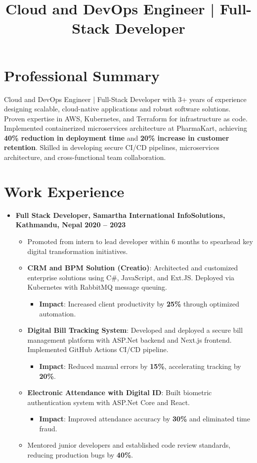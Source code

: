 \documentclass[11pt,a4paper,sans]{moderncv}
\title{Cloud and DevOps Engineer | Full-Stack Developer}
\newcommand{\sectionseparator}{\vspace{5pt}\par\noindent\makebox[\linewidth]{\rule{\textwidth}{0.4pt}}\vspace{0pt}}
\begin{document}
\makecvtitle

\section{Professional Summary}
Cloud and DevOps Engineer | Full-Stack Developer with 3+ years of experience designing scalable, cloud-native applications and robust software solutions. Proven expertise in AWS, Kubernetes, and Terraform for infrastructure as code. Implemented containerized microservices architecture at PharmaKart, achieving \textbf{40\% reduction in deployment time} and \textbf{20\% increase in customer retention}. Skilled in developing secure CI/CD pipelines, microservices architecture, and cross-functional team collaboration.

\sectionseparator

\section{Work Experience}
\begin{itemize}[leftmargin=*]
    \item \textbf{Full Stack Developer, Samartha International InfoSolutions, Kathmandu, Nepal} 
    \hfill \textbf{2020 -- 2023}
    \begin{itemize}
        \item Promoted from intern to lead developer within 6 months to spearhead key digital transformation initiatives.
        \item \textbf{CRM and BPM Solution (Creatio)}: Architected and customized enterprise solutions using C\#, JavaScript, and Ext.JS. Deployed via Kubernetes with RabbitMQ message queuing.
        \begin{itemize}
            \item \textbf{Impact}: Increased client productivity by \textbf{25\%} through optimized automation.
        \end{itemize}
        \item \textbf{Digital Bill Tracking System}: Developed and deployed a secure bill management platform with ASP.Net backend and Next.js frontend. Implemented GitHub Actions CI/CD pipeline.
        \begin{itemize}
            \item \textbf{Impact}: Reduced manual errors by \textbf{15\%}, accelerating tracking by \textbf{20\%}.
        \end{itemize}
        \item \textbf{Electronic Attendance with Digital ID}: Built biometric authentication system with ASP.Net Core and React.
        \begin{itemize}
            \item \textbf{Impact}: Improved attendance accuracy by \textbf{30\%} and eliminated time fraud.
        \end{itemize}
        \item Mentored junior developers and established code review standards, reducing production bugs by \textbf{40\%}.
    \end{itemize}
\end{itemize}
\end{document}
